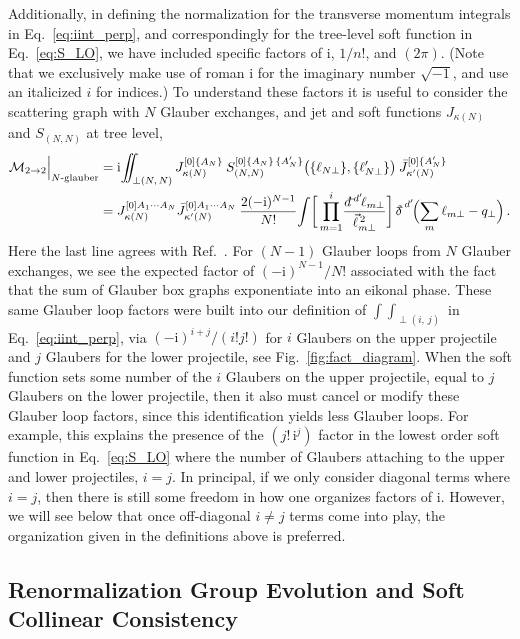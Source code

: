 \documentclass[letterpaper,11pt]{article}
\newcommand{\eq}[1]{Eq.~\eqref{eq:#1}}
\newcommand{\fig}[1]{Fig.~\ref{fig:#1}}
\newcommand{\img}{\mathrm{i}}
\newcommand{\cM}{\mathcal{M}}
\newcommand{\ddslash}{{d\!\!{}^-}}
\newcommand{\deltaslash}{{\delta\!\!\!{}^-}}
\newcommand{\nn}{\nonumber}
\newcommand{\IInt}{\int\!\!\!\!\!\int}
\begin{document}
Additionally, in defining the normalization for the transverse momentum integrals in \eq{iint_perp}, and correspondingly for the tree-level soft function in \eq{S_LO}, we have included specific factors of $\img$, $1/n!$, and $(2\pi)$. (Note that we exclusively make use of roman $\img$ for the imaginary number $\sqrt{-1}$, and use an italicized $i$ for indices.) To understand these factors it is useful to consider the scattering graph with $N$ Glauber exchanges, and jet and soft functions $J_{\kappa(N)}$ and $S_{(N,N)}$ at tree level, 
\begin{align}
  \cM_{2\to 2}\Big|_{N\text{-glauber}} 
 &= \img \! \IInt_{\perp(N,\,N)}  
  J_{\kappa(N)}^{[0]\{A_N\}} \:
  S_{(N,N)}^{[0]\{A_N\}\,\{A_N'\}}\bigl(\{\ell_{N\perp}\},\{\ell'_{N\perp}\}
   \bigr)\:
  \bar J_{\kappa'(N)}^{[0]\{A'_N\}}
 \nn\\
 &=
 J_{\kappa(N)}^{[0]A_1\cdots A_N} \bar J_{\kappa'(N)}^{[0]A_1\cdots A_N}\:
 \frac{2 (-\img)^{N-1}}{N!} 
 \!\int\!  \bigg[ \prod_{m=1}^{i}\! \frac{\ddslash\!^{d'}\!\ell_{m\perp}}{\vec\ell_{m\perp}^{\,2}} \bigg] \, \deltaslash^{d'}\!\Bigl(\sum_m \ell_{m\perp}- q_\perp\Bigr) \,.
\end{align} 
Here the last line agrees with Ref.~\cite{Rothstein:2016bsq}. For $(N-1)$ Glauber loops from $N$ Glauber exchanges, we see the expected factor of $(-\img)^{N-1}/N!$ associated with the fact that the sum of Glauber box graphs exponentiate into an eikonal phase. 
These same Glauber loop factors were built into our definition of 
$\int\!\!\!\int_{\perp(i,\,j)}$ in \eq{iint_perp}, via $(-\img)^{i+j}/(i! j!)$ for $i$ Glaubers on the upper projectile and $j$ Glaubers for the lower projectile, see \fig{fact_diagram}. When the soft function 
sets some number of the $i$ Glaubers on the upper projectile, equal to $j$ Glaubers on the lower projectile, then it also must cancel or modify these Glauber loop factors, since this identification yields less Glauber loops.  For example, this explains the presence of the $(j!\, \img^j)$ factor in the lowest order soft function in \eq{S_LO}  where the number of Glaubers attaching to the upper and lower projectiles, $i=j$.
In principal, if we only consider diagonal terms where $i=j$, then there is still some freedom in how one organizes factors of $\img$. However, we will see below that once off-diagonal $i\ne j$ terms come into play, the organization given in the definitions above is preferred. 

\subsection{Renormalization Group Evolution and Soft Collinear Consistency}\label{sec:consistent}
\end{document}
